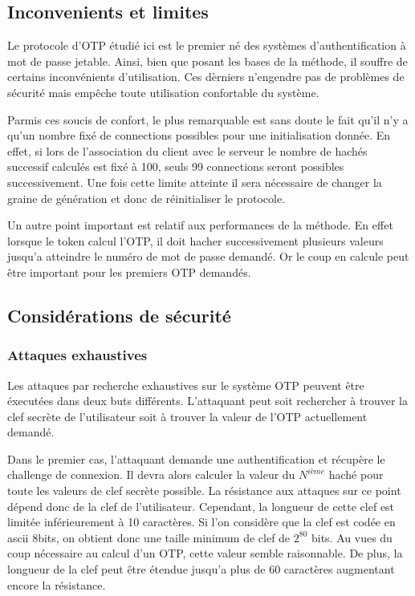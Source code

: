 \documentclass{../res/univ-projet}
\begin{document}
  \subsection{Inconvenients et limites}
  Le protocole d'OTP étudié ici est le premier né des systèmes 
  d'authentification à mot de passe jetable. Ainsi, bien que posant les bases
  de la méthode, il souffre de certains inconvénients d'utilisation. Ces 
  dèrniers n'engendre pas de problèmes de sécurité mais empêche toute 
  utilisation confortable du système.
  
  Parmis ces soucis de confort, le plus remarquable est sans doute le fait
  qu'il n'y a qu'un nombre fixé de connections possibles pour une 
  initialisation donnée. En effet, si lors de l'association du client avec 
  le serveur le nombre de hachés successif calculés est fixé à 100, seuls 
  99 connections seront possibles successivement. Une fois cette limite 
  atteinte il sera nécessaire de changer la graine de génération et donc
  de réinitialiser le protocole.
  
  Un autre point important est relatif aux performances de la méthode. En effet
  lorsque le token calcul l'OTP, il doit hacher successivement plusieurs 
  valeurs jusqu'a atteindre le numéro de mot de passe demandé. Or le coup en 
  calcule peut être important pour les premiers OTP demandés.
  
  \subsection{Considérations de sécurité}
    \subsubsection{Attaques exhaustives}
    Les attaques par recherche exhaustives sur le système OTP peuvent être 
    éxecutées dans deux buts différents. L'attaquant peut soit rechercher à
    trouver la clef secrète de l'utilisateur soit à trouver la valeur de l'OTP
    actuellement demandé.
    
    Dans le premier cas, l'attaquant demande une authentification et récupère 
    le challenge de connexion. Il devra alors calculer la valeur du $N^{ième}$ 
    haché pour toute les valeurs de clef secrète possible. La résistance aux
    attaques sur ce point dépend donc de la clef de l'utilisateur. Cependant, 
    la longueur de cette clef est limitée inférieurement à 10 caractères. Si
    l'on considère que la clef est codée en ascii 8bits, on obtient donc une 
    taille minimum de clef de $2^{80}$ bits. Au vues du coup nécessaire au 
    calcul d'un OTP, cette valeur semble raisonnable. De plus, la longueur de 
    la clef peut être étendue jusqu'a plus de 60 caractères augmentant encore
    la résistance.
    
\end{document}
